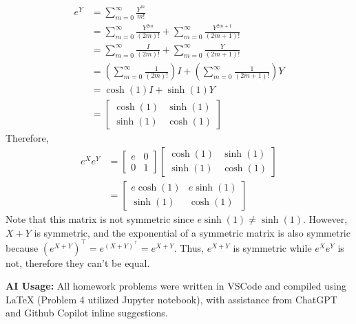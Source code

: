 \documentclass[11pt,a4paper,margin=1in]{article}
\begin{document}
\begin{enumerate}[(a)]
\begin{align*}
        e^Y &= \sum_{m = 0}^\infty \frac{Y^m}{m!} \\
        &= \sum_{m = 0}^\infty \frac{Y^{2m}}{(2m)!} + \sum_{m = 0}^\infty \frac{Y^{2m+1}}{(2m+1)!} \\
        &= \sum_{m = 0}^\infty \frac{I}{(2m)!} + \sum_{m = 0}^\infty \frac{Y}{(2m+1)!} \\
        &= \left(\sum_{m = 0}^\infty \frac{1}{(2m)!}\right) I + \left(\sum_{m = 0}^\infty \frac{1}{(2m+1)!}\right) Y \\
        &= \cosh(1) I + \sinh(1) Y \\
        &= \begin{bmatrix}
            \cosh(1) & \sinh(1) \\
            \sinh(1) & \cosh(1)
        \end{bmatrix}
    \end{align*}
    Therefore, 
    \begin{align*}
        e^Xe^Y &= \begin{bmatrix}
            e & 0 \\
            0 & 1
        \end{bmatrix} \begin{bmatrix}
            \cosh(1) & \sinh(1) \\
            \sinh(1) & \cosh(1)
        \end{bmatrix} \\
        &= \begin{bmatrix}
            e\cosh(1) & e\sinh(1) \\
            \sinh(1) & \cosh(1)
        \end{bmatrix}
    \end{align*}
    Note that this matrix is not symmetric since $e\sinh(1) \neq \sinh(1)$. However,
    $X + Y$ is symmetric, and the exponential of a symmetric matrix is also symmetric
    because $(e^{X + Y})^\top = e^{(X + Y)^\top} = e^{X + Y}$. Thus, $e^{X + Y}$ 
    is symmetric while $e^Xe^Y$ is not, therefore they can't be equal.
\end{enumerate}



\noindent 
\textbf{AI Usage:} All homework problems were written in VSCode and compiled using LaTeX
(Problem 4 utilized Jupyter notebook), with assistance from ChatGPT and Github 
Copilot inline suggestions.
\end{document}
